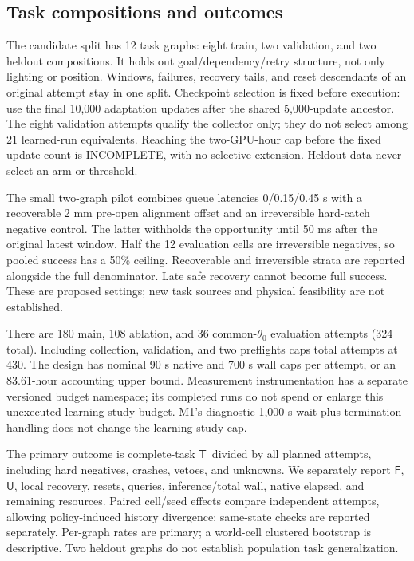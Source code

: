 \documentclass{article}
\newcommand{\True}{\ensuremath{\mathsf{T}}}
\newcommand{\False}{\ensuremath{\mathsf{F}}}
\newcommand{\Unk}{\ensuremath{\mathsf{U}}}
\begin{document}
\subsection{Task compositions and outcomes}
The candidate split has 12 task graphs: eight train, two validation, and two heldout compositions. It holds out goal/dependency/retry structure, not only lighting or position. Windows, failures, recovery tails, and reset descendants of an original attempt stay in one split. Checkpoint selection is fixed before execution: use the final 10,000 adaptation updates after the shared 5,000-update ancestor. The eight validation attempts qualify the collector only; they do not select among 21 learned-run equivalents. Reaching the two-GPU-hour cap before the fixed update count is INCOMPLETE, with no selective extension. Heldout data never select an arm or threshold.

The small two-graph pilot combines queue latencies 0/0.15/0.45 s with a recoverable 2 mm pre-open alignment offset and an irreversible hard-catch negative control. The latter withholds the opportunity until 50 ms after the original latest window. Half the 12 evaluation cells are irreversible negatives, so pooled success has a 50\% ceiling. Recoverable and irreversible strata are reported alongside the full denominator. Late safe recovery cannot become full success. These are proposed settings; new task sources and physical feasibility are not established.

There are 180 main, 108 ablation, and 36 common-\(\theta_0\) evaluation attempts (324 total). Including collection, validation, and two preflights caps total attempts at 430. The design has nominal 90 s native and 700 s wall caps per attempt, or an 83.61-hour accounting upper bound. Measurement instrumentation has a separate versioned budget namespace; its completed runs do not spend or enlarge this unexecuted learning-study budget. M1's diagnostic 1,000 s wait plus termination handling does not change the learning-study cap.

The primary outcome is complete-task \True\ divided by all planned attempts, including hard negatives, crashes, vetoes, and unknowns. We separately report \False, \Unk, local recovery, resets, queries, inference/total wall, native elapsed, and remaining resources. Paired cell/seed effects compare independent attempts, allowing policy-induced history divergence; same-state checks are reported separately. Per-graph rates are primary; a world-cell clustered bootstrap is descriptive. Two heldout graphs do not establish population task generalization.
\end{document}
